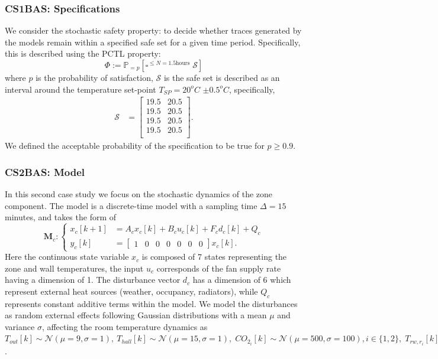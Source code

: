 \subsubsection{CS1BAS: Specifications}
We consider the stochastic safety property:  to decide whether traces generated by the models remain within a specified safe set for a given time period. Specifically, this is described using the PCTL property:
\begin{equation*}
\Phi:= \mathbb{P}_{= p} [\square^{\le N=1.5\text{hours}}\; \mathcal{S}]
\end{equation*}
where $p$ is the probability of satisfaction, $\mathcal{S}$ is the safe set is described as an interval around the temperature set-point $T_{SP} = 20^oC$ $\pm 0.5^oC$, specifically, 
\begin{align*}
\mathcal{S}&=\begin{bmatrix}
19.5 & 20.5 \\
19.5 & 20.5 \\
19.5 & 20.5 \\
19.5 & 20.5 \\
\end{bmatrix}.
\end{align*}
We defined the acceptable probability of the specification to be true for $p \ge 0.9$.

\subsubsection{CS2BAS: Model} 
In this second case study we focus on the {stochastic} dynamics of the zone component. The model is a discrete-time model with a sampling time $\Delta = 15$ minutes, and takes the form of
\begin{equation}
	\textbf{M}_{c}:
	\begin{cases}
	x_c[k+1] &= 
	A_{c}x_c[k] +B_cu_c[k]	+ F_{c}d_c[k]+ Q_c\\
	y_c[k]   &= \begin{bmatrix}
	1&0&0&0&0&0&0 \end{bmatrix}x_c[k]. 
	\end{cases}%
	\label{eqn:Mc}
\end{equation}
Here the continuous state variable $x_c$ is composed of 7 states representing the zone and wall temperatures, the input $u_c$ corresponds of the fan supply rate having a dimension of 1. The disturbance vector $d_c$ has a dimension of 6 which represent external heat sources (weather, occupancy, radiators), while $Q_c$ represents constant additive terms within the model. We model the disturbances as random external effects following  Gaussian distributions with a mean $\mu$ and variance $\sigma$,  affecting the room temperature dynamics as $T_{out}[k] \sim  \mathcal{N}(\mu=9,\sigma=1),~T_{hall}[k] \sim \mathcal{N}(\mu=15,\sigma=1),\; CO_{2_i}[k] \sim  \mathcal{N}(\mu=500,\sigma=100), i \in \{1,2\},\;
T_{rw,r_i}[k] \sim  \mathcal{N} (\mu =35, \sigma=5), i \in \{1,2\}$.\\

